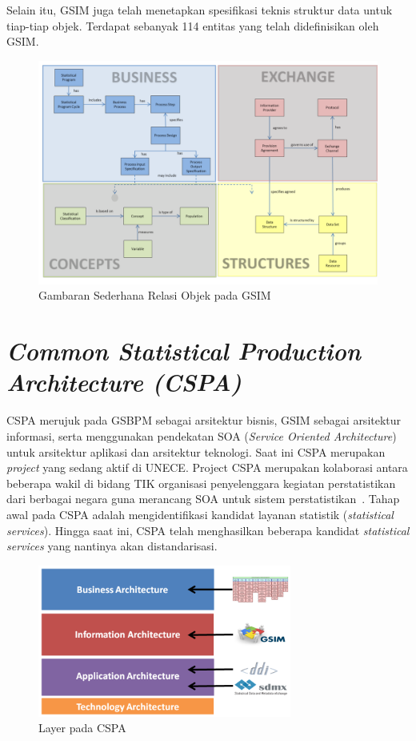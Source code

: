 Selain itu, GSIM juga telah menetapkan spesifikasi teknis struktur data untuk tiap-tiap objek. Terdapat sebanyak 114 entitas yang telah didefinisikan oleh GSIM.

\begin{figure}[h]
    \centering
    \includegraphics[width=13cm]{../../Resources/Images/object-relation-gsim}
    \caption{Gambaran Sederhana Relasi Objek pada GSIM}
    \label{fig:object-relation-gsim}
\end{figure}

\section{\textit{Common Statistical Production Architecture (CSPA)}}
CSPA merujuk pada GSBPM sebagai arsitektur bisnis, GSIM sebagai arsitektur informasi, serta menggunakan pendekatan SOA (\textit{Service Oriented Architecture}) untuk arsitektur aplikasi dan arsitektur teknologi. Saat ini CSPA merupakan \textit{project} yang sedang aktif di UNECE. Project CSPA merupakan kolaborasi antara beberapa wakil di bidang TIK organisasi penyelenggara kegiatan perstatistikan dari berbagai negara guna merancang SOA untuk sistem perstatistikan~\cite{_cspa_????}. Tahap awal pada CSPA adalah mengidentifikasi kandidat layanan statistik (\textit{statistical services}). Hingga saat ini, CSPA telah menghasilkan beberapa kandidat \textit{statistical services} yang nantinya akan distandarisasi.

\begin{figure}[h]
    \centering
    \includegraphics[height=5cm]{../../Resources/Images/cspa-layer}
    \caption{Layer pada CSPA}
    \label{fig:cspa-layer}
\end{figure}

